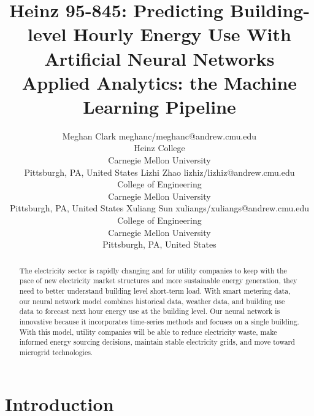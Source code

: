 \documentclass[twoside,11pt]{article}
\begin{document}
\title{Heinz 95-845: Predicting Building-level Hourly Energy Use With Artificial Neural Networks\\ Applied Analytics: the Machine Learning Pipeline}

\author{\name Meghan Clark \email meghanc/meghanc@andrew.cmu.edu \\
       \addr Heinz College\\
       Carnegie Mellon University\\
       Pittsburgh, PA, United States
       \AND
       \name Lizhi Zhao \email lizhiz/lizhiz@andrew.cmu.edu \\
       \addr College of Engineering\\
       Carnegie Mellon University \\
       Pittsburgh, PA, United States
       \AND
       \name Xuliang Sun \email xuliangs/xuliangs@andrew.cmu.edu \\
       \addr College of Engineering\\
       Carnegie Mellon University \\
       Pittsburgh, PA, United States} 

\maketitle

\begin{abstract}
 The electricity sector is rapidly changing and for utility companies to keep with the pace of new electricity market structures and more sustainable energy generation, they need to better understand building level short-term load. With smart metering data, our neural network model combines historical data, weather data, and building use data to forecast next hour energy use at the building level. Our neural network is innovative because it incorporates time-series methods and focuses on a single building. With this model, utility companies will be able to reduce electricity waste, make informed energy sourcing decisions, maintain stable electricity grids, and move toward microgrid technologies. 
\end{abstract}


\section{Introduction}
\end{document}
